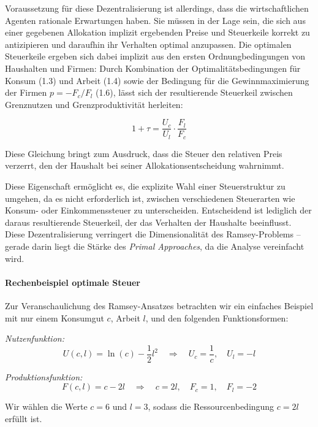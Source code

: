 Voraussetzung für diese Dezentralisierung ist allerdings, dass die wirtschaftlichen Agenten rationale Erwartungen haben. Sie müssen in der Lage sein, die sich aus einer gegebenen Allokation implizit ergebenden Preise und Steuerkeile korrekt zu antizipieren und daraufhin ihr Verhalten optimal anzupassen. Die optimalen Steuerkeile ergeben sich dabei implizit aus den ersten Ordnungbedingungen von Haushalten und Firmen: Durch Kombination der Optimalitätsbedingungen für Konsum (1.3) und Arbeit (1.4) sowie der Bedingung für die Gewinnmaximierung der Firmen \( p = -F_c / F_l \) (1.6), lässt sich der resultierende Steuerkeil zwischen Grenznutzen und Grenzproduktivität herleiten:

\begin{equation}
1 + \tau = \frac{U_c}{U_l} \cdot \frac{F_l}{F_c} \tag{1.7}
\end{equation} 

Diese Gleichung bringt zum Ausdruck, dass die Steuer den relativen Preis verzerrt, den der Haushalt bei seiner Allokationsentscheidung wahrnimmt.

Diese Eigenschaft ermöglicht es, die explizite Wahl einer Steuerstruktur zu umgehen, da es nicht erforderlich ist, zwischen verschiedenen Steuerarten wie Konsum- oder Einkommenssteuer zu unterscheiden. Entscheidend ist lediglich der daraus resultierende Steuerkeil, der das Verhalten der Haushalte beeinflusst. Diese Dezentralisierung verringert die Dimensionalität des Ramsey-Problems – gerade darin liegt die Stärke des \textit{Primal Approaches}, da die Analyse vereinfacht wird.




\paragraph{Rechenbeispiel optimale Steuer}

Zur Veranschaulichung des Ramsey-Ansatzes betrachten wir ein einfaches Beispiel mit nur einem Konsumgut \( c \), Arbeit \( l \), und den folgenden Funktionsformen:

\textit{Nutzenfunktion:}
\[
U(c, l) = \ln(c) - \frac{1}{2}l^2 \quad \Rightarrow \quad U_c = \frac{1}{c}, \quad U_l = -l
\]

\textit{Produktionsfunktion:}
\[
F(c, l) = c - 2l \quad \Rightarrow \quad c = 2l, \quad F_c = 1, \quad F_l = -2
\]

Wir wählen die Werte \( c = 6 \) und \( l = 3 \), sodass die Ressourcenbedingung \( c = 2l \) erfüllt ist.

